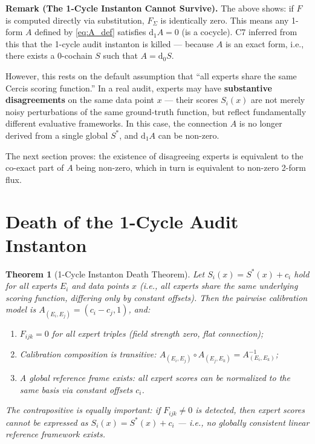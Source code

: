 \documentclass[12pt,a4paper]{article}
\theoremstyle{plain}
\newtheorem{theorem}{Theorem}
\theoremstyle{definition}
\theoremstyle{remark}
\newcommand{\dd}{\mathrm{d}}
\begin{document}
\bigskip
\noindent
\textbf{Remark (The 1-Cycle Instanton Cannot Survive).}
The above shows: if $F$ is computed directly via substitution, $F_\Sigma$ is identically zero. This means any 1-form $A$ defined by \eqref{eq:A_def} satisfies $\dd_1 A = 0$ (is a cocycle). C7 inferred from this that the 1-cycle audit instanton is killed --- because $A$ is an exact form, i.e., there exists a 0-cochain $S$ such that $A = \dd_0 S$.

However, this rests on the default assumption that ``all experts share the same Cercis scoring function.'' In a real audit, experts may have \textbf{substantive disagreements} on the same data point $x$ --- their scores $S_i(x)$ are not merely noisy perturbations of the same ground-truth function, but reflect fundamentally different evaluative frameworks. In this case, the connection $A$ is no longer derived from a single global $S^*$, and $\dd_1 A$ can be non-zero.

The next section proves: the existence of disagreeing experts is equivalent to the co-exact part of $A$ being non-zero, which in turn is equivalent to non-zero 2-form flux.

\section{Death of the 1-Cycle Audit Instanton}
\label{sec:death}

\begin{theorem}[1-Cycle Instanton Death Theorem]
\label{thm:C7}
Let $S_i(x) = S^*(x) + c_i$ hold for all experts $E_i$ and data points $x$ (i.e., all experts share the same underlying scoring function, differing only by constant offsets). Then the pairwise calibration model is $A_{(E_i, E_j)} = (c_i - c_j, 1)$, and:

\begin{enumerate}[label=(\roman*), leftmargin=*]
    \item $F_{ijk} = 0$ for all expert triples (field strength zero, flat connection);
    \item Calibration composition is transitive: $A_{(E_i, E_j)} \circ A_{(E_j, E_k)} = A_{(E_i, E_k)}^{-1}$;
    \item A global reference frame exists: all expert scores can be normalized to the same basis via constant offsets $c_i$.
\end{enumerate}

The contrapositive is equally important: if $F_{ijk} \neq 0$ is detected, then expert scores cannot be expressed as $S_i(x) = S^*(x) + c_i$ --- i.e., no globally consistent linear reference framework exists.
\end{theorem}
\end{document}
